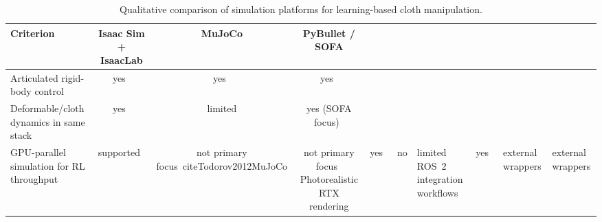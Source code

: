 \begin{table}[htb]
    \centering
    \caption{Qualitative comparison of simulation platforms for learning-based cloth manipulation.}\label{tab:simulator_comparison}
    \begin{tabular}{l c c c}
    \hline
    \textbf{Criterion} & \textbf{Isaac Sim + IsaacLab} & \textbf{MuJoCo} & \textbf{PyBullet / SOFA} \\
    \hline
    Articulated rigid-body control & yes~\cite{isaac_sim_510_physics_fundamentals} & yes~\cite{Todorov2012MuJoCo} & yes~\cite{pybullet_home} \\
    Deformable/cloth dynamics in same stack & yes~\cite{physx_541_gpu_rigid_bodies} & limited %
    & yes (SOFA focus)~\cite{Allard2007SOFA} \\
    GPU-parallel simulation for RL throughput & supported~\cite{physx_541_gpu_rigid_bodies,isaaclab_multi_gpu_doc} & not primary focus~cite{Todorov2012MuJoCo}%
    & not primary focus~\cite{pybullet_home} %
    Photorealistic RTX rendering & yes~\cite{isaac_sim_510_overview,omniverse_rtx_renderer_doc} & no %
    & limited %
    ROS~2 integration workflows & yes~\cite{isaac_sim_ros2_reference_architecture_510} & external wrappers %
    & external wrappers %
    \hline
    \end{tabular}
\end{table}

